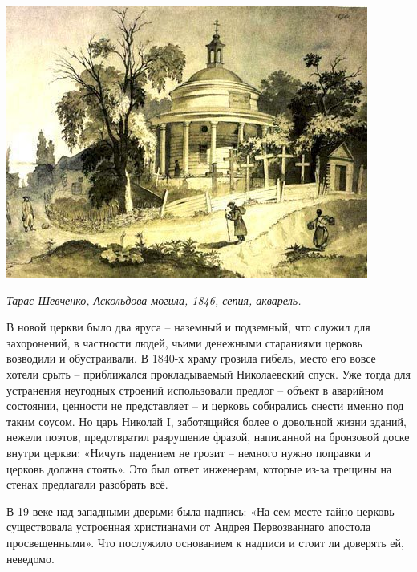 \begin{center}
\includegraphics[width=\linewidth]{chast-volga/oskoldidir/shevchenko_am.jpg}

\textit{Тарас Шевченко, Аскольдова могила, 1846, сепия, акварель.}
\end{center}

В новой церкви было два яруса – наземный и подземный, что служил для захоронений, в частности людей, чьими денежными стараниями церковь возводили и обустраивали. В 1840-х храму грозила гибель, место его вовсе хотели срыть – приближался прокладываемый Николаевский спуск. Уже тогда для устранения неугодных строений использовали предлог – объект в аварийном состоянии, ценности не представляет – и церковь собирались снести именно под таким соусом. Но царь Николай I, заботящийся более о довольной жизни зданий, нежели поэтов, предотвратил разрушение фразой, написанной на бронзовой доске внутри церкви: «Ничуть падением не грозит – немного нужно поправки и церковь должна стоять». Это был ответ инженерам, которые из-за трещины на стенах предлагали разобрать всё.

В 19 веке над западными дверьми была надпись: «На сем месте тайно церковь существовала устроенная христианами от Андрея Первозваннаго апостола просвещенными». Что послужило основанием к надписи и стоит ли доверять ей, неведомо.

